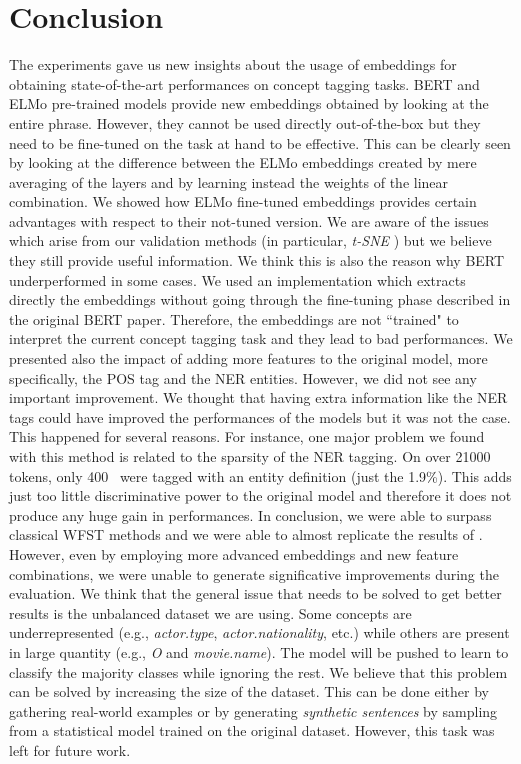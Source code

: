 \documentclass[11pt,a4paper]{article}
\begin{document}
\section{Conclusion}
The experiments gave us new insights about the usage of embeddings for obtaining state-of-the-art performances on concept tagging tasks. BERT and ELMo pre-trained models provide new embeddings obtained by looking at the entire phrase. However, they cannot be used directly out-of-the-box but they need to be fine-tuned on the task at hand to be effective. This can be clearly seen by looking at the difference between the ELMo embeddings created by mere averaging of the layers and by learning instead the weights of the linear combination. We showed how ELMo fine-tuned embeddings provides certain advantages with respect to their not-tuned version. We are aware of the issues which arise from our validation methods (in particular, \textit{t-SNE} \cite{wattenberg2016how}) but we believe they still provide useful information. We think this is also the reason why BERT underperformed in some cases. We used an implementation which extracts directly the embeddings without going through the fine-tuning phase described in the original BERT paper. Therefore, the embeddings are not ``trained" to interpret the current concept tagging task and they lead to bad performances.
We presented also the impact of adding more features to the original model, more specifically, the POS tag and the NER entities. However, we did not see any important improvement. We thought that having extra information like the NER tags could have improved the performances of the models but it was not the case. This happened for several reasons. For instance, one major problem we found with this method is related to the sparsity of the NER tagging. On over 21000 tokens, only 400~ were tagged with an entity definition (just the 1.9\%). This adds just too little discriminative power to the original model and therefore it does not produce any huge gain in performances.
In conclusion, we were able to surpass classical WFST methods and we were able to almost replicate the results of \citet{gobbi}. However, even by employing more advanced embeddings and new feature combinations, we were unable to generate significative improvements during the evaluation.  
We think that the general issue that needs to be solved to get better results is the unbalanced dataset we are using. Some concepts are underrepresented (e.g., \textit{actor.type}, \textit{actor.nationality}, etc.) while others are present in large quantity (e.g., \textit{O} and \textit{movie.name}). The model will be pushed to learn to classify the majority classes while ignoring the rest. We believe that this problem can be solved by increasing the size of the dataset. This can be done either by gathering real-world examples or by generating \textit{synthetic sentences} by sampling from a statistical model trained on the original dataset. However, this task was left for future work.



\end{document}
